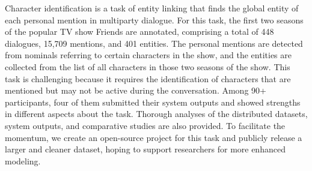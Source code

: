 Character identification is a task of entity linking that finds the global entity of each personal mention in multiparty dialogue. For this task, the first two seasons of the popular TV show Friends are annotated, comprising a total of 448 dialogues, 15,709 mentions, and 401 entities. The personal mentions are detected from nominals referring to certain characters in the show, and the entities are collected from the list of all characters in those two seasons of the show. This task is challenging because it requires the identification of characters that are mentioned but may not be active during the conversation. Among 90+ participants, four of them submitted their system outputs and showed strengths in different aspects about the task. Thorough analyses of the distributed datasets, system outputs, and comparative studies are also provided. To facilitate the momentum, we create an open-source project for this task and publicly release a larger and cleaner dataset, hoping to support researchers for more enhanced modeling.
